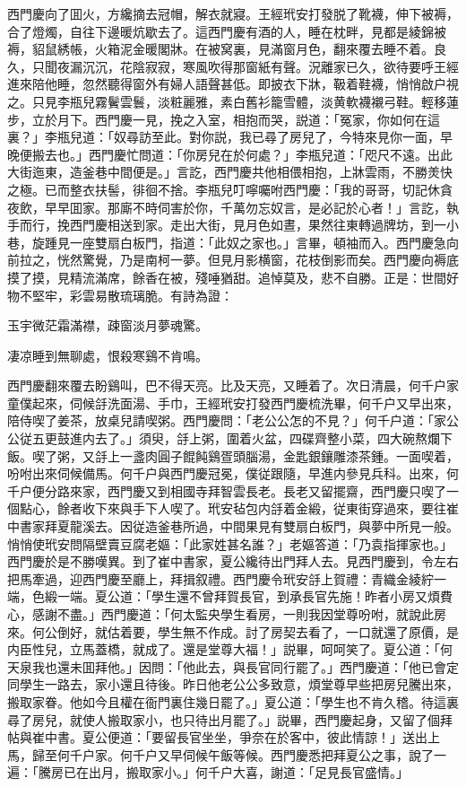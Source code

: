 西門慶向了囬火，方纔摘去冠帽，解衣就寢。王經玳安打發脱了靴襪，伸下被褥，合了燈燭，自往下邊暖炕歇去了。這西門慶有酒的人，睡在枕畔，見都是綾錦被褥，貂鼠綉帳，火箱泥金暖閣牀。在被窝裏，見滿窗月色，翻來覆去睡不着。良久，只聞夜漏沉沉，花陰寂寂，寒風吹得那窗紙有聲。況離家已久，欲待要呼王經進來陪他睡，忽然聽得窗外有婦人語聲甚低。即披衣下牀，靸着鞋襪，悄悄啟户視之。只見李瓶兒霧鬢雲鬟，淡粧麗雅，素白舊衫籠雪體，淡黄軟襪襯弓鞋。輕移蓮步，立於月下。西門慶一見，挽之入室，相抱而哭，説道：「冤家，你如何在這裏？」李瓶兒道：「奴尋訪至此。對你説，我已尋了房兒了，今特來見你一面，早晚便搬去也。」西門慶忙問道：「你房兒在於何處？」李瓶兒道：「咫尺不遠。出此大街迤東，造釜巷中間便是。」言訖，西門慶共他相偎相抱，上牀雲雨，不勝羙快之極。已而整衣扶髻，徘徊不捨。李瓶兒叮嚀囑咐西門慶：「我的哥哥，切記休貪夜飲，早早囬家。那廝不時伺害於你，千萬勿忘奴言，是必記於心者！」言訖，執手而行，挽西門慶相送到家。走出大街，見月色如晝，果然往東轉過牌坊，到一小巷，旋踵見一座雙扇白板門，指道：「此奴之家也。」言畢，頓袖而入。西門慶急向前拉之，恍然驚覺，乃是南柯一夢。但見月影横窗，花枝倒影而矣。西門慶向褥底摸了摸，見精流滿席，餘香在被，殘唾猶甜。追悼莫及，悲不自勝。正是：世間好物不堅牢，彩雲易散琉璃脆。有詩為證：

\begin{myquote}
玉宇微茫霜滿襟，疎窗淡月夢魂驚。

凄凉睡到無聊處，恨殺寒鷄不肯鳴。
\end{myquote}

西門慶翻來覆去盼鷄叫，巴不得天亮。比及天亮，又睡着了。次日清晨，何千户家童僕起來，伺候㧱洗面湯、手巾，王經玳安打發西門慶梳洗畢，何千户又早出來，陪侍喫了姜茶，放桌兒請喫粥。西門慶問：「老公公怎的不見？」何千户道：「家公公従五更鼓進内去了。」須臾，㧱上粥，圍着火盆，四碟齊整小菜，四大碗熬爛下飯。喫了粥，又㧱上一盞肉圓子餛飩鷄疍頭腦湯，金匙銀鑲雕漆茶鍾。一面喫着，吩咐出來伺候備馬。何千户與西門慶冠冕，僕従跟隨，早進内參見兵科。出來，何千户便分路來家，西門慶又到相國寺拜智雲長老。長老又留擺齋，西門慶只喫了一個點心，餘者收下來與手下人喫了。玳安毡包内㧱着金緞，従東街穿過來，要往崔中書家拜夏龍溪去。因従造釜巷所過，中間果見有雙扇白板門，與夢中所見一般。悄悄使玳安問隔壁賣豆腐老嫗：「此家姓甚名誰？」老嫗答道：「乃袁指揮家也。」西門慶於是不勝嘆異。到了崔中書家，夏公纔待出門拜人去。見西門慶到，令左右把馬牽過，迎西門慶至廳上，拜揖叙禮。西門慶令玳安㧱上賀禮：青織金綾紵一端，色緞一端。夏公道：「學生還不曾拜賀長官，到承長官先施！昨者小房又煩費心，感謝不盡。」西門慶道：「何太監央學生看房，一則我因堂尊吩咐，就說此房來。何公倒好，就估着要，學生無不作成。討了房契去看了，一口就還了原價，是内臣性兒，立馬蓋橋，就成了。還是堂尊大福！」説畢，呵呵笑了。夏公道：「何天泉我也還未囬拜他。」因問：「他此去，與長官同行罷了。」西門慶道：「他已會定同學生一路去，家小還且待後。昨日他老公公多致意，煩堂尊早些把房兒騰出來，搬取家眷。他如今且權在衙門裏住幾日罷了。」夏公道：「學生也不肯久稽。待這裏尋了房兒，就使人搬取家小，也只待出月罷了。」説畢，西門慶起身，又留了個拜帖與崔中書。夏公便道：「要留長官坐坐，爭奈在於客中，彼此情諒！」送出上馬，歸至何千户家。何千户又早伺候午飯等候。西門慶悉把拜夏公之事，說了一遍：「騰房已在出月，搬取家小。」何千户大喜，謝道：「足見長官盛情。」

